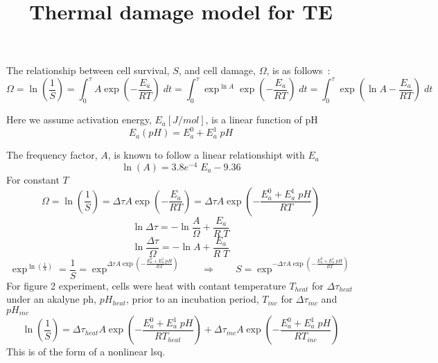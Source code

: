 \documentclass{article}         %
\title{Thermal damage model for TE}
\author{}
\theoremstyle{definition}
\theoremstyle{remark}
\begin{document}
                

The relationship between cell survival, $S$, and cell
damage, $\Omega$, is as follows~\cite{he2003quantification}:
\[
\Omega = \ln \left(\frac{1}{S}\right)
       = \int_0^\tau  A \exp\left( -\frac{E_a}{R T} \right)\; dt
       = \int_0^\tau  \exp ^{\ln A} \exp\left( -\frac{E_a}{R T} \right)\; dt
       = \int_0^\tau   \exp\left( \ln A-\frac{E_a}{R T} \right)\; dt
\]

Here we assume activation energy, $E_a [J/mol]$, is a linear function of pH
\[
   E_a(pH) = E_a^0 + E_a^1  \; pH
\]

The frequency factor, $A$, is known to follow a linear relationshipt with $E_a$
\[
  \ln (A) = 3.8e^{-4} \; E_a  - 9.36
\]
For constant $T$
\[
         \Omega
       = \ln \left(\frac{1}{S}\right)
       = \Delta\tau  A \exp\left( -\frac{E_a}{R T} \right)
       = \Delta\tau  A \exp\left( -\frac{E_a^0 + E_a^1  \; pH}{R T} \right)
\]
\[
\ln \Delta \tau = - \ln\frac{ A}{ \Omega} + \frac{E_a}{R\; T}
\]
\[
\ln \frac{  \Delta \tau}{ \Omega} = - \ln A  + \frac{E_a}{R\; T}
\]
\[
       \exp^{\ln \left(\frac{1}{S}\right)} = 
                   \frac{1}{S}
       = \exp^{\Delta\tau  A \exp\left( -\frac{E_a^0 + E_a^1  \; pH}{R T} \right)}
  \qquad \Rightarrow \qquad
   S = \exp^{- \Delta\tau  A \exp\left( -\frac{E_a^0 + E_a^1  \; pH}{R T} \right)}
\]
For figure 2 experiment, cells were heat with contant temperature $T_{heat}$ for $\Delta \tau_{heat}$
under an akalyne ph, $pH_{heat}$,
prior to an incubation period, $T_{inc}$ for $\Delta \tau_{inc}$ and $pH_{inc}$
\[
         \ln \left(\frac{1}{S}\right)
       = \Delta\tau_{heat}  A \exp\left( -\frac{E_a^0 + E_a^1  \; pH}{R T_{heat}} \right)
       + \Delta\tau_{inc}  A \exp\left( -\frac{E_a^0 + E_a^1  \; pH}{R T_{inc}} \right)
\]
This is of the form of a nonlinear lsq.
\end{document}

